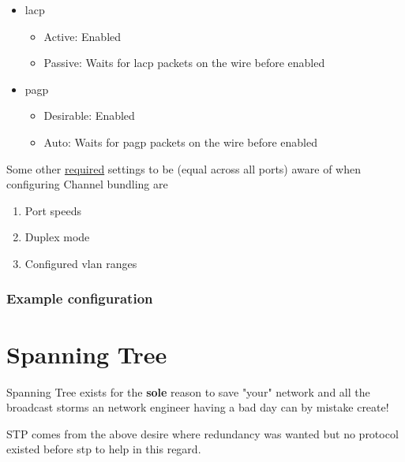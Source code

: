\begin{itemize}
    \item \gls{lacp}
    \begin{itemize}
        \item Active: Enabled
        \item Passive: Waits for \gls{lacp} packets on the wire before enabled
    \end{itemize}
    \item \gls{pagp}
    \begin{itemize}
        \item Desirable: Enabled
        \item Auto: Waits for \gls{pagp} packets on the wire before enabled
    \end{itemize}
\end{itemize}

Some other \underline{required} settings to be (equal across all ports) aware of when configuring Channel bundling are
\begin{enumerate}
    \item Port speeds
    \item Duplex mode
    \item Configured \gls{vlan} ranges
\end{enumerate}

\subsubsection{Example configuration}


\newpage


\section{Spanning Tree}

Spanning Tree exists for the \textbf{sole} reason to save "your" network and all the broadcast storms an network engineer having a bad day can by mistake create!

STP comes from the above desire where redundancy was wanted but no protocol existed before \gls{stp} to help in this regard.

